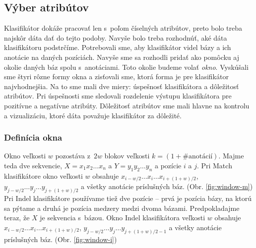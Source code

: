 \subsection{Výber atribútov}
\label{subsec:attribute-selection}

Klasifikátor dokáže pracovať len s~poľom číselných atribútov, preto bolo treba najskôr dáta dať do tejto podoby. Navyše bolo treba rozhodnúť, aké dáta klasifikátoru podstrčíme. Potrebovali sme, aby klasifikátor videl bázy a ich anotácie na daných pozíciách. Navyše sme sa rozhodli pridať ako pomôcku aj okolie daných báz spolu s~anotáciami. Toto okolie budeme volať \textit{okno}. Vyskúšali sme štyri rôzne formy okna a zisťovali sme, ktorá forma je pre klasifikátor najvhodnejšia. Na to sme mali dve miery: úspešnosť klasifikátora a dôležitosť atribútov. Pri úspešnosti sme sledovali rozdelenie výstupu klasifikátora pre pozitívne a negatívne atribúty. Dôležitosť atribútov sme mali hlavne na kontrolu a vizualizáciu, ktoré dáta považuje klasifikátor za dôležité.

\subsubsection{Definícia okna}
Okno veľkosti $w$ pozostáva z~$2w$ blokov veľkosti $k = (1+\#\text{anotácií})$.
Majme teda dve sekvencie, $X = x_1 x_2 \dots x_n$ a $Y = y_1 y_2 \dots y_n$ a pozície $i$ a $j$.
Pri Match klasifikátore okno veľkosti $w$ obsahuje $x_{i - w/2}\dots x_i \dots x_{i + (1 + w)/2}$, $y_{j - w/2}\dots y_j \dots y_{j + (1 + w)/2}$ a všetky anotácie príslušných báz. (Obr. \ref{fig:window-m})
Pri Indel klasifikátore používame tiež dve pozície -- prvá je pozícia bázy, na ktorú sa pýtame a druhá je pozícia medzery medzi dvoma bázami.
Predpokladajme teraz, že $X$ je sekvencia s~bázou. Okno Indel klasifikátora veľkosti $w$ obsahuje $x_{i - w/2}\dots x_i \dots x_{i + (1 + w)/2}$, $y_{j - w/2}\dots y_j \dots y_{j + (1 + w)/2 - 1}$ a všetky anotácie príslušných báz. (Obr. \ref{fig:window-i})

